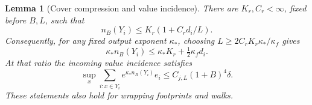 \documentclass[11pt,reqno]{amsart}
\numberwithin{equation}{section}
\newtheorem{lemma}[theorem]{Lemma}
\theoremstyle{definition}
\theoremstyle{remark}
\begin{document}
\begin{lemma}[Cover compression and value incidence]
\label{lem:sharp-cover-compression}
There are \(K_r,C_r<\infty\), fixed before \(B,L\), such that
\begin{equation}
 n_B(Y_i)\le K_r(1+C_rd_i/L).
 \label{eq:sharp-cover-compression}
\end{equation}
Consequently, for any fixed output exponent \(\kappa_*\),
choosing \(L\ge2C_rK_r\kappa_*/\kappa_f\) gives
\begin{equation}
 \kappa_* n_B(Y_i)\le\kappa_*K_r+\tfrac12\kappa_f d_i.
 \label{eq:sharp-cover-exponent}
\end{equation}
At that ratio the incoming value incidence satisfies
\begin{equation}
 \sup_x\sum_{i:x\in Y_i}e^{\kappa_*n_B(Y_i)}e_i
                         \le C_{j,L}(1+B)^4\delta.
 \label{eq:sharp-compressed-incidence}
\end{equation}
These statements also hold for wrapping footprints and walks.
\end{lemma}
\end{document}

